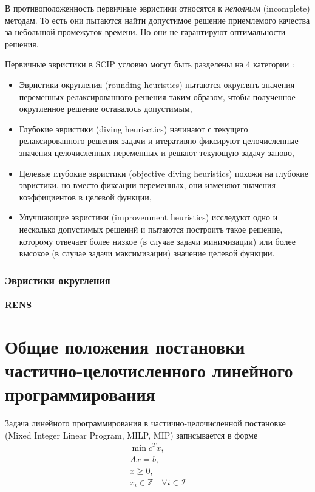 \documentclass[%
	11pt,
	a4paper,
	utf8,
		]{article}
\begin{document}
В противоположенность первичные эвристики относятся к \emph{неполным} (incomplete) методам. То есть они пытаются найти допустимое решение приемлемого качества за небольшой промежуток времени. Но они не гарантируют оптимальности решения.

Первичные эвристики в SCIP условно могут быть разделены на 4 категории \cite{achterberg:constr_int_prog}:
\begin{itemize}
	\item Эвристики округления (rounding heuristics) пытаются округлять значения переменных релаксированного решения таким образом, чтобы полученное округленное решение оставалось допустимым,
	
	\item Глубокие эвристики (diving heurisctics) начинают с текущего релаксированного решения задачи и итеративно фиксируют целочисленные значения целочисленных переменных и решают текующую задачу заново,
	
	\item Целевые глубокие эвристики (objective diving heuristics) похожи на глубокие эвристики, но вместо фиксации переменных, они изменяют значения коэффициентов в целевой функции,
	
	\item Улучшающие эвристики (improvenment heuristics) исследуют одно и несколько допустимых решений и пытаются построить такое решение, которому отвечает более низкое (в случае задачи минимизации) или более высокое (в случае задачи максимизации) значение целевой функции.
\end{itemize}

\subsubsection{Эвристики округления}

\paragraph{RENS} 


\section{Общие положения постановки частично-целочисленного линейного программирования}

Задача линейного программирования в частично-целочисленной постановке (Mixed Integer Linear Program, MILP, MIP) записывается в форме
\begin{align*}
	\min c^T x,\\
	Ax = b,\\
	x \geqslant 0,\\
	x_i \in \mathbb{Z} \quad \forall i \in \mathcal{I}
\end{align*}
\end{document}
